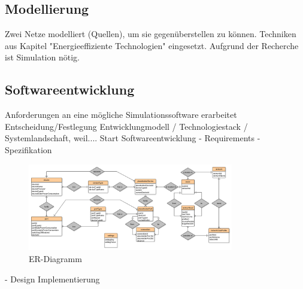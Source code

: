 \documentclass[12pt,titlepage]{article}
\begin{document}
\subsection{Modellierung}
Zwei Netze modelliert (Quellen), um sie gegenüberstellen zu können. Techniken aus Kapitel "Energieeffiziente Technologien" eingesetzt.
Aufgrund der Recherche ist Simulation nötig.

\subsection{Softwareentwicklung}

Anforderungen an eine mögliche Simulationssoftware erarbeitet
Entscheidung/Festlegung Entwicklungmodell / Technologiestack / Systemlandschaft, weil....
Start Softwareentwicklung
	- Requirements
	- Spezifikation
	
\begin{figure}[!ht]
\centering
\includegraphics[width=0.8\textwidth]{MethSoftwareER}
\caption{ER-Diagramm} %
\label{fig:MethSoftwareER}
\end{figure}
	
	- Design
Implementierung
\end{document}
